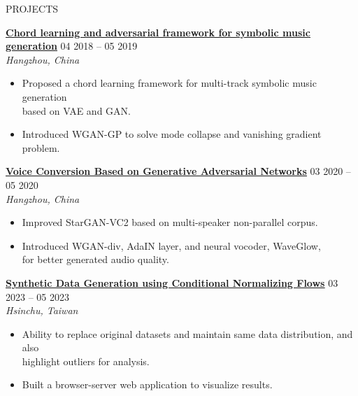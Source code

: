 \documentclass{resume}
\begin{document}
\begin{rSection}{PROJECTS}
\vspace{-1.25em}
    \item \textbf{\href{https://docs.google.com/presentation/d/1797idRRmgeD2JnUslGbflmGUO2X5lMY6/edit?usp=drive_link&ouid=101248488395326982475&rtpof=true&sd=true}{\textbf{\large{\underline{Chord learning and adversarial framework for symbolic music generation}}}}} \hfill {04 2018 -- 05 2019}\\
    \mbox{} \hfill \textit{Hangzhou, China}
    \begin{itemize}
        \item Proposed a chord learning framework for multi-track symbolic music generation\\based on VAE and GAN.
        \item Introduced WGAN-GP to solve mode collapse and vanishing gradient problem.
    \end{itemize}

    \item \textbf{\href{https://drive.google.com/file/d/1736XHtaeT58FL_gbOa9XjlyA6xAXDkg2/view?usp=drive_link}{\textbf{\large{\underline{Voice Conversion Based on Generative Adversarial Networks}}}}} \hfill {03 2020 -- 05 2020}\\
    \mbox{} \hfill \textit{Hangzhou, China}
    \begin{itemize}
        \item Improved StarGAN-VC2 based on multi-speaker non-parallel corpus.
        \item Introduced WGAN-div, AdaIN layer, and neural vocoder, WaveGlow,\\for better generated audio quality.
    \end{itemize}
    
    \item \textbf{\href{https://drive.google.com/file/d/176xCWH6j0VAuoXLtB_HppxyZN-6ezq9_/view?usp=drive_link}{\textbf{\large{\underline{Synthetic Data Generation using Conditional Normalizing Flows}}}}} \hfill {03 2023 -- 05 2023}\\
    \mbox{} \hfill \textit{Hsinchu, Taiwan}
    \begin{itemize}
        \item Ability to replace original datasets and maintain same data distribution, and also\\
        highlight outliers for analysis.
        \item Built a browser-server web application to visualize results.
    \end{itemize}


\end{rSection}
\end{document}
